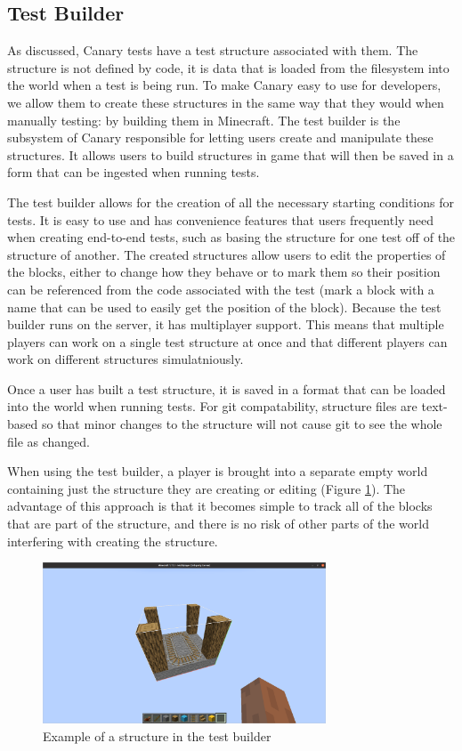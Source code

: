 \documentclass[12pt]{article}
\begin{document}
\begin{onehalfspacing}
\subsection{Test Builder}

As discussed, Canary tests have a test structure associated with them.
The structure is not defined by code, it is data that is loaded from the
filesystem into the world when a test is being run. To make Canary easy
to use for developers, we allow them to create these structures in the
same way that they would when manually testing: by building them in
Minecraft. The test builder is the subsystem of Canary responsible for
letting users create and manipulate these structures. It allows users to
build structures in game that will then be saved in a form that can be
ingested when running tests.

The test builder allows for the creation of all the necessary starting
conditions for tests. It is easy to use and has convenience features
that users frequently need when creating end-to-end tests, such as
basing the structure for one test off of the structure of another. The
created structures allow users to edit the properties of the blocks,
either to change how they behave or to mark them so their position can
be referenced from the code associated with the test (mark a block with
a name that can be used to easily get the position of the block).
Because the test builder runs on the server, it has multiplayer support.
This means that multiple players can work on a single test structure at
once and that different players can work on different structures
simulatniously.

Once a user has built a test structure, it is saved in a format that can
be loaded into the world when running tests. For git compatability,
structure files are text-based so that minor changes to the structure
will not cause git to see the whole file as changed.

When using the test builder, a player is brought into a separate empty
world containing just the structure they are creating or editing (Figure
\ref{fig:4_1_1}). The advantage of this approach is that it becomes simple to
track all of the blocks that are part of the structure, and there is no
risk of other parts of the world interfering with creating the
structure.
\begin{figure}[h] 
    \centering
    \includegraphics[width=0.75\textwidth]{media/media/image9.png} 
    \caption{Example of a structure in the test builder} 
    \label{fig:4_1_1}  
\end{figure}


\end{onehalfspacing}
\end{document}

